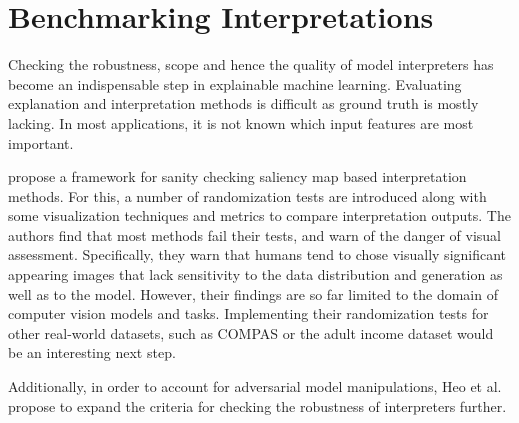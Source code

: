 \section{Benchmarking Interpretations}
\label{sec:benchmarking}

Checking the robustness, scope and hence the quality of model interpreters has become an indispensable step in explainable machine learning. 
Evaluating explanation and interpretation methods is difficult as ground truth is mostly lacking. In most applications, it is not known which input features are most important. 

\cite{adebayo2018sanity} propose a framework for sanity checking saliency map based interpretation methods. For this, a number of randomization tests are introduced along with some visualization techniques and metrics to compare interpretation outputs. The authors find that most methods fail their tests, and warn of the danger of visual assessment. Specifically, they warn that humans tend to chose visually significant appearing images that lack sensitivity to the data distribution and generation as well as to the model. 
However, their findings are so far limited to the domain of computer vision models and tasks. %
Implementing their randomization tests for other real-world datasets, such as COMPAS \cite{compas_dataset} or the adult income dataset \cite{adult_income} would be an interesting next step. 

Additionally, in order to account for adversarial model manipulations, Heo et al. \cite{fooling_nn_interpreters} propose to expand the criteria for checking the robustness of interpreters further.

